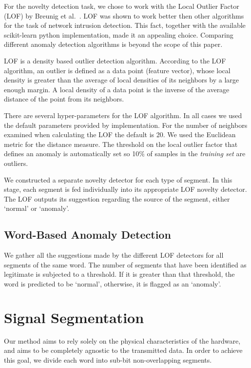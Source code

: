 \documentclass[conference]{IEEEtran}
\begin{document}
  For the novelty detection task, we chose to work with the Local Outlier Factor (LOF) by Breunig et al.\ \cite{breunig2000lof}. LOF was shown to work better then other algorithms for the task of network intrusion detection\cite{lazarevic2003comparative}. This fact, together with the available scikit-learn \cite{scikit-learn} python implementation, made it an appealing choice. Comparing different anomaly detection algorithms is beyond the scope of this paper.
  
  LOF is a density based outlier detection algorithm. According to the LOF algorithm, an outlier is defined as a data point (feature vector), whose local density is greater than the average of local densities of its neighbors by a large enough margin. A local density of a data point is the inverse of the average distance of the point from its neighbors.
  
  There are several hyper-parameters for the LOF algorithm. In all cases we used the default parameters provided by implementation. For the number of neighbors examined when calculating the LOF the default is 20. We used the Euclidean metric for the distance measure. The threshold on the local outlier factor that defines an anomaly is automatically set so 10\% of samples in the \textit{training set} are outliers.
  
  We constructed a separate novelty detector for each type of segment. In this stage, each segment is fed individually into its appropriate LOF novelty detector. The LOF outputs its suggestion regarding the source of the segment, either `normal' or `anomaly'.
  
\subsection{Word-Based Anomaly Detection}
  We gather all the suggestions made by the different LOF detectors for all segments of the same word. The number of segments that have been identified as legitimate is subjected to a threshold. If it is greater than that threshold, the word is predicted to be `normal', otherwise, it is flagged as an `anomaly'.
  



\section{Signal Segmentation} \label{SignalSegmentation}
  Our method aims to rely solely on the physical characteristics of the hardware, and aims to be completely agnostic to the transmitted data. In order to achieve this goal, we divide each word into sub-bit non-overlapping segments.
  
\end{document}
